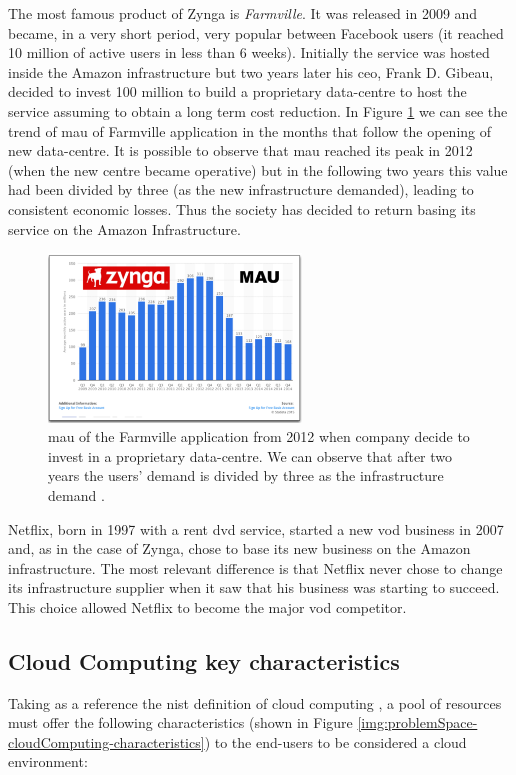 The most famous product of Zynga is \textit{Farmville}. It was released in 2009 and became, in a very
short period, very popular between Facebook users (it reached 10 million of active users in less than
6 weeks). Initially the service was hosted inside the Amazon infrastructure but two years later his
\acs{ceo}, Frank D. Gibeau, decided to invest \textdollar{}100 million to build a proprietary data-centre
to host the service assuming to obtain a long term cost reduction. In Figure
\ref{img:problemSpace-capexOpex-zyngaCase} we can see the trend of \ac{mau} of Farmville application
in the months that follow the opening of new data-centre. It is possible to observe that \ac{mau} reached
its peak in 2012 (when the new centre became operative) but in the following two years this value had
been divided by three (as the new infrastructure demanded), leading to consistent economic losses.
Thus the society has decided to return basing its service on the Amazon Infrastructure.

\begin{figure}
	\centering{}
	\includegraphics[width=0.6\textwidth]{chapters/problem/images/zynga-case.png}
	\caption[\acs{mau} of Farmville application after 2012]{\acf{mau} of the Farmville application from
		2012 when company decide to invest in a proprietary data-centre. We can observe that after two
		years the users' demand is divided by three as the infrastructure demand \cite{netflixZynga}.}
	\label{img:problemSpace-capexOpex-zyngaCase}
\end{figure}

Netflix, born in 1997 with a rent \acs{dvd} service, started a new \ac{vod} business in 2007 and, as
in the case of Zynga, chose to base its new business on the Amazon infrastructure. The most relevant
difference is that Netflix never chose to change its infrastructure supplier when it saw that his
business was starting to succeed. This choice allowed Netflix to become the major \ac{vod} competitor.

\subsection*{Cloud Computing key characteristics}
Taking as a reference the \ac{nist} definition of cloud computing \cite{nistCloudComputing}, a pool of resources
must offer the following characteristics (shown in Figure \ref{img:problemSpace-cloudComputing-characteristics})
to the end-users to be considered a cloud environment:


